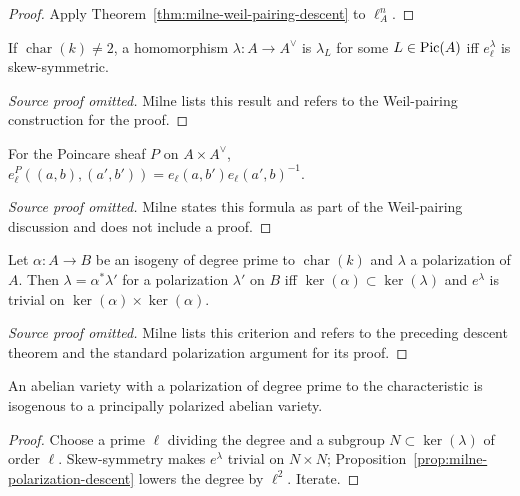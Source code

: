\begin{proof}
Apply Theorem~\ref{thm:milne-weil-pairing-descent} to $\ell^n_A$.
\end{proof}

\begin{proposition}\label{prop:milne-weil-pairing-skew}
If $\operatorname{char}(k)\ne2$, a homomorphism $\lambda:A\to A^\vee$ is $\lambda_L$ for some $L\in\operatorname{Pic}(A)$ iff $e_\ell^\lambda$ is skew-symmetric.
\end{proposition}
\begin{proof}[Source proof omitted]
Milne lists this result and refers to the Weil-pairing construction for the
proof.
\end{proof}
\begin{lemma}\label{lem:milne-poincare-pairing}
For the Poincare sheaf $P$ on $A\times A^\vee$, $e_\ell^P((a,b),(a',b'))=e_\ell(a,b')e_\ell(a',b)^{-1}$.
\end{lemma}
\begin{proof}[Source proof omitted]
Milne states this formula as part of the Weil-pairing discussion and does not
include a proof.
\end{proof}
\begin{proposition}\label{prop:milne-polarization-descent}
Let $\alpha:A\to B$ be an isogeny of degree prime to $\operatorname{char}(k)$ and $\lambda$ a polarization of $A$. Then $\lambda=\alpha^*\lambda'$ for a polarization $\lambda'$ on $B$ iff $\ker(\alpha)\subset\ker(\lambda)$ and $e^\lambda$ is trivial on $\ker(\alpha)\times\ker(\alpha)$.
\end{proposition}
\begin{proof}[Source proof omitted]
Milne lists this criterion and refers to the preceding descent theorem and the
standard polarization argument for its proof.
\end{proof}
\begin{corollary}\label{cor:milne-principal-polarization}
An abelian variety with a polarization of degree prime to the characteristic is isogenous to a principally polarized abelian variety.
\end{corollary}

\begin{proof}

Choose a prime $\ell$ dividing the degree and a subgroup $N\subset\ker(\lambda)$ of order $\ell$. Skew-symmetry makes $e^\lambda$ trivial on $N\times N$; Proposition~\ref{prop:milne-polarization-descent} lowers the degree by $\ell^2$. Iterate.

\end{proof}


